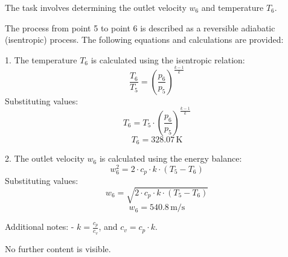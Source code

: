 The task involves determining the outlet velocity \( w_6 \) and temperature \( T_6 \).  

The process from point 5 to point 6 is described as a reversible adiabatic (isentropic) process. The following equations and calculations are provided:  

1. The temperature \( T_6 \) is calculated using the isentropic relation:  
\[
\frac{T_6}{T_5} = \left( \frac{p_6}{p_5} \right)^{\frac{k-1}{k}}
\]  
Substituting values:  
\[
T_6 = T_5 \cdot \left( \frac{p_6}{p_5} \right)^{\frac{k-1}{k}}
\]  
\[
T_6 = 328.07 \, \text{K}
\]  

2. The outlet velocity \( w_6 \) is calculated using the energy balance:  
\[
w_6^2 = 2 \cdot c_p \cdot k \cdot (T_5 - T_6)
\]  
Substituting values:  
\[
w_6 = \sqrt{2 \cdot c_p \cdot k \cdot (T_5 - T_6)}
\]  
\[
w_6 = 540.8 \, \text{m/s}
\]  

Additional notes:  
- \( k = \frac{c_p}{c_v} \), and \( c_v = c_p \cdot k \).  

No further content is visible.